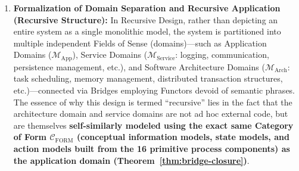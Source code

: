 \documentclass[11pt,a4paper]{article}
\theoremstyle{definition}
\theoremstyle{plain}
\theoremstyle{remark}
\newcommand{\CFORM}{\mathcal{C}_{\mathrm{FORM}}}
\begin{document}
\begin{enumerate}
    \item \textbf{Formalization of Domain Separation and Recursive Application (Recursive Structure):}
    In Recursive Design, rather than depicting an entire system as a single monolithic model, the system is partitioned into multiple independent Fields of Sense (domains)---such as Application Domains ($\mathcal{M}_{\mathrm{App}}$), Service Domains ($\mathcal{M}_{\mathrm{Service}}$: logging, communication, persistence management, etc.), and Software Architecture Domains ($\mathcal{M}_{\mathrm{Arch}}$: task scheduling, memory management, distributed transaction structures, etc.)---connected via Bridges employing Functors devoid of semantic phrases. The essence of why this design is termed ``recursive'' lies in the fact that the architecture domain and service domains are not ad hoc external code, but are themselves \textbf{self-similarly modeled using the exact same Category of Form $\CFORM$ (conceptual information models, state models, and action models built from the 16 primitive process components) as the application domain (Theorem~\ref{thm:bridge-closure})}.


\end{enumerate}
\end{document}

